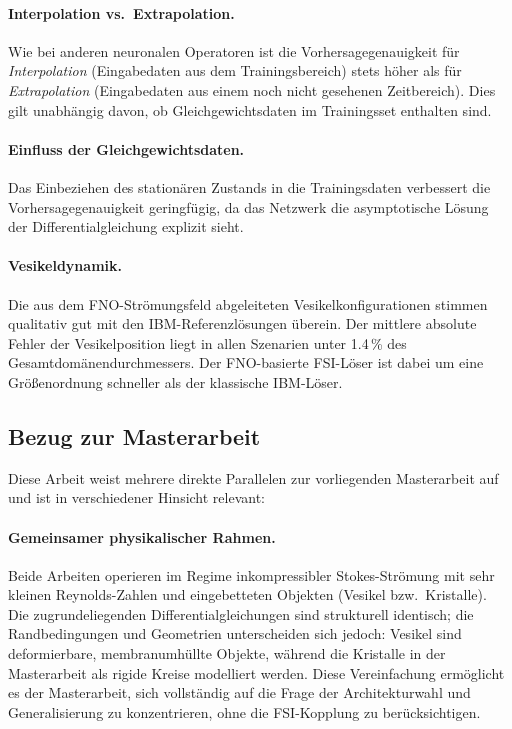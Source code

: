 \documentclass[a4paper,12pt]{article}
\begin{document}
\paragraph{Interpolation vs.\ Extrapolation.}
Wie bei anderen neuronalen Operatoren ist die Vorhersagegenauigkeit für
\emph{Interpolation} (Eingabedaten aus dem Trainingsbereich) stets höher
als für \emph{Extrapolation} (Eingabedaten aus einem noch nicht gesehenen
Zeitbereich).  Dies gilt unabhängig davon, ob Gleichgewichtsdaten im
Trainingsset enthalten sind.

\paragraph{Einfluss der Gleichgewichtsdaten.}
Das Einbeziehen des stationären Zustands in die Trainingsdaten verbessert die
Vorhersagegenauigkeit geringfügig, da das Netzwerk die asymptotische Lösung
der Differentialgleichung explizit sieht.

\paragraph{Vesikeldynamik.}
Die aus dem FNO-Strömungsfeld abgeleiteten Vesikelkonfigurationen stimmen
qualitativ gut mit den IBM-Referenzlösungen überein.  Der mittlere absolute
Fehler der Vesikelposition liegt in allen Szenarien unter 1.4\,\% des
Gesamtdomänendurchmessers.  Der FNO-basierte FSI-Löser ist dabei um eine
Größenordnung schneller als der klassische IBM-Löser.

\subsection*{Bezug zur Masterarbeit}

Diese Arbeit weist mehrere direkte Parallelen zur vorliegenden Masterarbeit
auf und ist in verschiedener Hinsicht relevant:

\paragraph{Gemeinsamer physikalischer Rahmen.}
Beide Arbeiten operieren im Regime inkompressibler Stokes-Strömung mit sehr
kleinen Reynolds-Zahlen und eingebetteten Objekten (Vesikel bzw.\ Kristalle).
Die zugrundeliegenden Differentialgleichungen sind strukturell identisch; die
Randbedingungen und Geometrien unterscheiden sich jedoch: Vesikel sind
deformierbare, membranumhüllte Objekte, während die Kristalle in der
Masterarbeit als rigide Kreise modelliert werden.  Diese Vereinfachung
ermöglicht es der Masterarbeit, sich vollständig auf die Frage der
Architekturwahl und Generalisierung zu konzentrieren, ohne die FSI-Kopplung
zu berücksichtigen.
\end{document}
